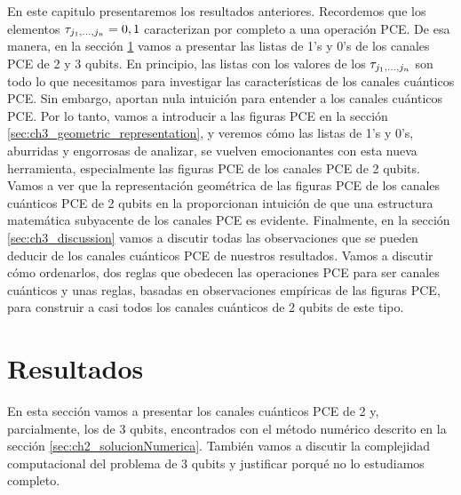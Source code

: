 En este capitulo presentaremos los resultados anteriores.
Recordemos que los elementos $\tau_{j_1,\ldots ,j_n}=0,1$ caracterizan por completo a una 
operación PCE. De esa manera, en la sección \ref{sec:ch3_resultados} vamos a presentar
las listas de 1's y 0's de los canales PCE de 2 y 3 qubits. En principio, las 
listas con los valores de los $\tau_{j_1,\ldots ,j_n}$ son todo lo que necesitamos para investigar las características de 
los canales cuánticos PCE. Sin embargo, aportan nula intuición para entender
a los canales cuánticos PCE. Por lo tanto,
vamos a introducir a las figuras PCE en la sección 
\ref{sec:ch3_geometric_representation}, y veremos cómo las listas de 1's y 0's,
aburridas y engorrosas de analizar, se vuelven emocionantes con esta 
nueva herramienta, especialmente las figuras PCE de los canales 
PCE de 2 qubits.
Vamos a ver que la representación geométrica de las figuras PCE de 
los canales cuánticos PCE de 2 qubits en la
 proporcionan intuición de 
que una estructura matemática subyacente de los canales PCE es evidente.
Finalmente, en la sección \ref{sec:ch3_discussion} vamos a discutir 
todas las observaciones que se pueden deducir de los canales cuánticos PCE
de nuestros resultados. Vamos a discutir cómo ordenarlos, dos reglas 
que obedecen las operaciones PCE para ser canales cuánticos y unas 
reglas, basadas en observaciones empíricas de las figuras PCE, para 
construir a casi todos los canales cuánticos de 2 qubits de este tipo. 

\section{Resultados}\label{sec:ch3_resultados} %
En esta sección vamos a presentar los canales cuánticos PCE de 2 y,
parcialmente, los de 3 qubits, 
encontrados con el método numérico descrito en la sección 
\ref{sec:ch2_solucionNumerica}. También vamos a discutir la complejidad 
computacional del problema de 3 qubits y justificar porqué no lo estudiamos completo.

